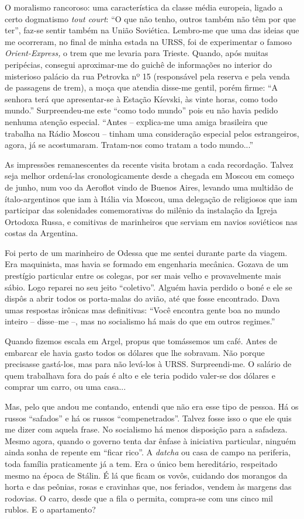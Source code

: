 O moralismo rancoroso: uma característica da classe média europeia,
ligado a certo dogmatismo \emph{tout court}: ``O que não tenho, outros
também não têm por que ter'', faz-se sentir também na União Soviética.
Lembro-me que uma das ideias que me ocorreram, no final de minha estada
na URSS, foi de experimentar o famoso \emph{Orient-Express,} o trem que
me levaria para Trieste. Quando, após muitas peripécias, consegui
aproximar-me do guichê de informações no interior do misterioso palácio
da rua Petrovka nº 15 (responsável pela reserva e pela venda de
passagens de trem), a moça que atendia disse-me gentil, porém firme: ``A
senhora terá que apresentar-se à Estação Kíevski, às vinte horas, como
todo mundo.'' Surpreendeu-me este ``como todo mundo'' pois eu não havia
pedido nenhuma atenção especial. ``Antes -- explica-me uma amiga
brasileira que trabalha na Rádio Moscou -- tinham uma consideração
especial pelos estrangeiros, agora, já se acostumaram. Tratam-nos como
tratam a todo mundo...''

As impressões remanescentes da recente visita brotam a cada recordação.
Talvez seja melhor ordená-las cronologicamente desde a chegada em Moscou
em começo de junho, num voo da Aeroflot vindo de Buenos Aires, levando
uma multidão de ítalo-argentinos que iam à Itália via Moscou, uma
delegação de religiosos que iam participar das solenidades comemorativas
do milênio da instalação da Igreja Ortodoxa Russa, e comitivas de
marinheiros que serviam em navios soviéticos nas costas da Argentina.

Foi perto de um marinheiro de Odessa que me sentei durante parte da
viagem. Era maquinista, mas havia se formado em engenharia mecânica.
Gozava de um prestígio particular entre os colegas, por ser mais velho e
provavelmente mais sábio. Logo reparei no seu jeito ``coletivo''. Alguém
havia perdido o boné e ele se dispôs a abrir todos os porta-malas do
avião, até que fosse encontrado. Dava umas respostas irônicas mas
definitivas: ``Você encontra gente boa no mundo inteiro -- disse--me --,
mas no socialismo há mais do que em outros regimes.''

Quando fizemos escala em Argel, propus que tomássemos um café. Antes de
embarcar ele havia gasto todos os dólares que lhe sobravam. Não porque
precisasse gastá-los, mas para não levá-los à URSS. Surpreendi-me. O
salário de quem trabalhava fora do país é alto e ele teria podido
valer-se dos dólares e comprar um carro, ou uma casa...

Mas, pelo que andou me contando, entendi que não era esse tipo de
pessoa. Há os russos ``safados'' e há os russos ``compenetrados''.
Talvez fosse isso o que ele quis me dizer com aquela frase. No
socialismo há menos disposição para a safadeza. Mesmo agora, quando o
governo tenta dar ênfase à iniciativa particular, ninguém ainda sonha de
repente em ``ficar rico''. A \emph{datcha} ou casa de campo na
periferia, toda família praticamente já a tem. Era o único bem
hereditário, respeitado mesmo na época de Stálin. É lá que ficam os
vovôs, cuidando dos morangos da horta e das peônias, rosas e cravinhas
que, nos feriados, vendem às margens das rodovias. O carro, desde que a
fila o permita, compra-se com uns cinco mil rublos. E o apartamento?

